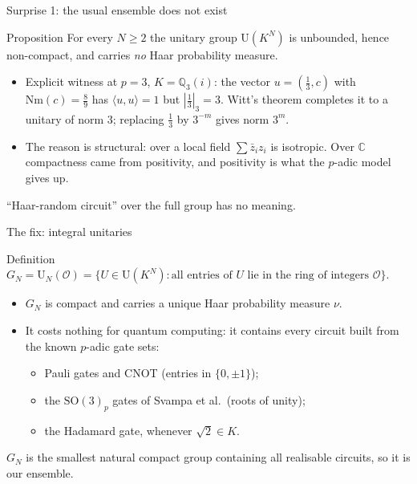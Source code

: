 \documentclass[aspectratio=169,compress]{beamer}
\newcommand{\OK}{\mathcal{O}}
\newcommand{\Uni}{\mathrm{U}}
\newcommand{\Nm}{\mathrm{Nm}}
\newcommand{\inner}[2]{\langle #1, #2\rangle}
\begin{document}
\begin{frame}{Surprise 1: the usual ensemble does not exist}
  \begin{alertblock}{Proposition}
    For every $N\ge2$ the unitary group $\Uni(K^{N})$ is unbounded, hence
    non-compact, and carries \emph{no} Haar probability measure.
  \end{alertblock}
  \begin{itemize}
    \item Explicit witness at $p=3$, $K=\mathbb{Q}_3(i)$: the vector
      $u=(\tfrac13,c)$ with $\Nm(c)=\tfrac89$ has $\inner uu=1$ but
      $|\tfrac13|_3=3$. Witt's theorem completes it to a unitary of norm $3$;
      replacing $\tfrac13$ by $3^{-m}$ gives norm $3^{m}$.
    \item The reason is structural: over a local field $\sum\bar z_iz_i$ is
      \alert{isotropic}. Over $\mathbb{C}$ compactness came from
      positivity, and positivity is what the $p$-adic model gives up.
  \end{itemize}
  \vspace{0.3em}
  ``Haar-random circuit'' over the full group has no meaning.
\end{frame}

\begin{frame}{The fix: integral unitaries}
  \begin{block}{Definition}
    $G_N=\Uni_N(\OK)=\{U\in\Uni(K^{N}) : \text{all entries of $U$ lie in the
    ring of integers } \OK\}$.
  \end{block}
  \begin{itemize}
    \item $G_N$ is compact and carries a unique Haar probability measure $\nu$.
    \item It costs nothing for quantum computing: it contains every circuit
      built from the known $p$-adic gate sets:
      \begin{itemize}
        \item Pauli gates and CNOT (entries in $\{0,\pm1\}$);
        \item the $\mathrm{SO}(3)_p$ gates of Svampa et al.\ (roots of unity);
        \item the Hadamard gate, whenever $\sqrt2\in K$.
      \end{itemize}
  \end{itemize}
  \vspace{0.3em}
  $G_N$ is the smallest natural compact group containing all realisable
  circuits, so it is our ensemble.
\end{frame}
\end{document}

